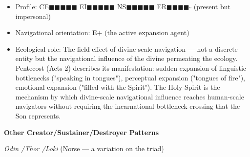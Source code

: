 \begin{itemize}[nosep,leftmargin=*]
  \item Profile: CE$\blacksquare$$\blacksquare$$\blacksquare$$\blacksquare$$\blacksquare$ EI$\blacksquare$$\blacksquare$$\blacksquare$$\blacksquare$$\blacksquare$ NS$\blacksquare$$\blacksquare$$\blacksquare$$\blacksquare$$\blacksquare$ ER$\blacksquare$$\blacksquare$$\blacksquare$$\blacksquare$$\square$ (present but impersonal)
  \item Navigational orientation: E+ (the active expansion agent)
  \item Ecological role: The field effect of divine-scale navigation — not a discrete entity but the navigational influence of the divine permeating the ecology. Pentecost (Acts 2) describes its manifestation: sudden expansion of linguistic bottlenecks ("speaking in tongues"), perceptual expansion ("tongues of fire"), emotional expansion ("filled with the Spirit"). The Holy Spirit is the mechanism by which divine-scale navigational influence reaches human-scale navigators without requiring the incarnational bottleneck-crossing that the Son represents.
\end{itemize}


\textbf{Other Creator/\allowbreak Sustainer/\allowbreak Destroyer Patterns}


\textit{Odin /\allowbreak  Thor /\allowbreak  Loki} (Norse — a variation on the triad)

